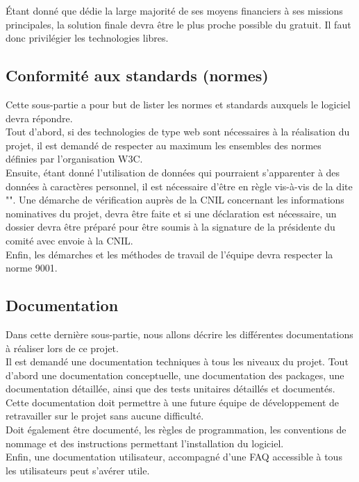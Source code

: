 Étant donné que \nomClient{} dédie la large majorité de ses moyens financiers à ses missions principales, la solution finale devra être le plus proche possible du gratuit. Il faut donc privilégier les technologies libres.


\subsection{Conformité aux standards (normes)}
Cette sous-partie a pour but de lister les normes et standards auxquels le logiciel devra répondre.\\

Tout d'abord, si des technologies de type web sont nécessaires à la réalisation du projet, il est demandé de respecter au maximum les ensembles des normes définies par l'organisation W3C.\\

Ensuite, étant donné l'utilisation de données qui pourraient s'apparenter à des données à caractères personnel, il est nécessaire d'être en règle vis-à-vis de la \loiInfoLib{} dite "\loiInfoLibCourt{}". Une démarche de vérification auprès de la CNIL concernant les informations nominatives du projet, devra être faite et si une déclaration est nécessaire, un dossier devra être préparé pour être soumis à la signature de la présidente du comité avec envoie à la CNIL.\\

Enfin, les démarches et les méthodes de travail de l'équipe \PICCourt{} devra respecter la norme \ISOCourt{} 9001.

\subsection{Documentation}
\label{doc}
Dans cette dernière sous-partie, nous allons décrire les différentes documentations à réaliser lors de ce projet.\\

Il est demandé une documentation techniques à tous les niveaux du projet. Tout d'abord une documentation conceptuelle, une documentation des packages, une documentation détaillée, ainsi que des tests unitaires détaillés et documentés. Cette documentation doit permettre à une future équipe de développement de retravailler sur le projet sans aucune difficulté.\\

Doit également être documenté, les règles de programmation, les conventions de nommage et des instructions permettant l'installation du logiciel.\\

Enfin, une documentation utilisateur, accompagné d'une FAQ accessible à tous les utilisateurs peut s'avérer utile.
